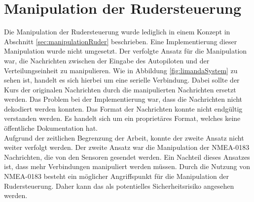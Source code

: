 \section{Manipulation der Rudersteuerung}
Die Manipulation der Rudersteuerung wurde lediglich in einem Konzept in Abschnitt \ref{sec:manipulationRuder} beschrieben.
Eine Implementierung dieser Manipulation wurde nicht umgesetzt. 
Der verfolgte Ansatz für die Manipulation war, die Nachrichten zwischen der Eingabe des Autopiloten und der 
Verteilungseinheit zu manipulieren. Wie in Abbildung \ref{fig:limandaSystem} zu sehen ist, handelt es sich hierbei um eine 
serielle Verbindung.
Dabei sollte der Kurs der originalen Nachrichten durch die manipulierten Nachrichten
ersetzt werden. Das Problem bei der Implementierung war, dass die Nachrichten nicht dekodiert werden konnten. 
Das Format der Nachrichten konnte nicht endgültig verstanden werden. Es handelt sich um ein proprietäres Format,
welches keine öffentliche Dokumentation hat. \\
Aufgrund der zeitlichen Begrenzung der Arbeit, konnte der zweite Ansatz nicht weiter verfolgt werden. 
Der zweite Ansatz war die Manipulation der NMEA-0183 Nachrichten, die von den Sensoren gesendet werden.
Ein Nachteil dieses Ansatzes ist, dass mehr Verbindungen manipuliert werden müssen.
Durch die Nutzung von NMEA-0183 besteht ein möglicher Angriffspunkt für die Manipulation der Rudersteuerung.
Daher kann das als potentielles Sicherheitsrisiko angesehen werden.